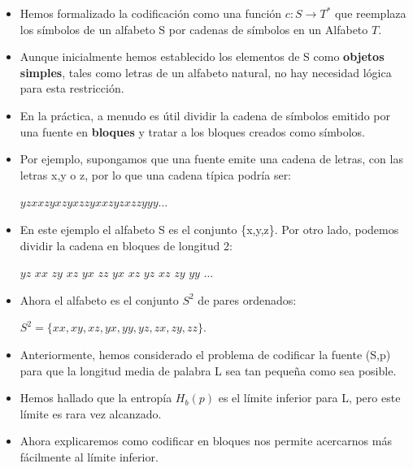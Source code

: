 \documentclass{beamer}
\theoremstyle{plain}
\theoremstyle{example}
\theoremstyle{example}
\begin{document}
\begin{frame}     \small

\begin{itemize}
\item Hemos formalizado la codificación como una función $c: S\rightarrow T^{*}$ que reemplaza los símbolos de un alfabeto S por cadenas de símbolos en un Alfabeto $T$. 

\item Aunque inicialmente hemos establecido los elementos de S como \textbf{objetos simples}, tales como letras de un alfabeto natural, no hay necesidad lógica para esta restricción. 

\item En la práctica, a menudo es útil dividir la cadena de símbolos emitido por una fuente en \textbf{bloques}  y tratar a los bloques creados como símbolos.

\item Por ejemplo, supongamos que una fuente emite una cadena de letras, con las letras x,y o z, por lo que una cadena típica podría ser:

\begin{center}
$yzxxzyxzyxzzyxxzyzxzzyyy \ldots$
\end{center}

\end{itemize}
 

\end{frame}


\begin{frame}  \small 

\begin{itemize}
\item
En este ejemplo el alfabeto S es el conjunto \{x,y,z\}.  Por otro lado, podemos dividir la cadena en bloques de longitud 2:

\begin{center}
$yz$ $xx$ $zy$ $xz$ $yx$ $zz$ $yx$ $xz$ $yz$ $xz$ $zy$ $yy$ $\ldots$
\end{center}

\item Ahora el alfabeto es el conjunto $S^{2}$ de pares ordenados:

\begin{center}
$S^{2} =\{xx,xy,xz,yx,yy,yz,zx,zy,zz\}.$
\end{center}

\item Anteriormente, hemos considerado el problema de codificar la fuente (S,p) para que la longitud media de palabra L sea tan pequeña como sea posible.

\item Hemos hallado que la entropía $H_b(p)$  es el límite inferior para L, pero este límite es rara vez alcanzado. 

\item Ahora explicaremos como codificar en bloques nos permite acercarnos más fácilmente  al límite inferior. 
\end{itemize}
\end{frame} 
\end{document}

